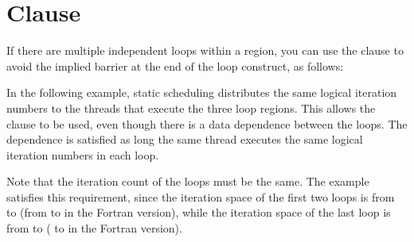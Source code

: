 \pagebreak
\section{ Clause}
\label{sec:nowait}

If there are multiple independent loops within a  region, you 
can use the  clause to avoid the implied barrier at the end of the 
loop construct, as follows:



In the following example, static scheduling distributes the same logical iteration 
numbers to the threads that execute the three loop regions. This allows the  
clause to be used, even though there is a data dependence between the loops. The 
dependence is satisfied as long the same thread executes the same logical iteration 
numbers in each loop.

Note that the iteration count of the loops must be the same. The example satisfies 
this requirement, since the iteration space of the first two loops is from  
to  (from  to  in the Fortran version), while the 
iteration space of the last loop is from  to  ( to 
 in the Fortran version).



